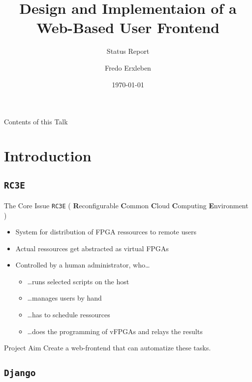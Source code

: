 \documentclass{beamer}
\title{Design and Implementaion of a Web-Based \rccce{} User Frontend}
\subtitle{Status Report}
\author{Fredo Erxleben}
\date{\today}
\institute{Chair for VLSI Design, Diagnostics and Architecture}
\newcommand{\rccce}{\texttt{RC3E}}
\newcommand{\django}{\texttt{Django}}
\begin{document}
\maketitle

    \begin{frame}{Contents of this Talk}
        \tableofcontents
    \end{frame}


\section{Introduction}
\subsection{\rccce{}}

    \begin{frame}{The Core Issue}
        \rccce{} (
            \textbf{R}econfigurable 
            \textbf{C}ommon 
            \textbf{C}loud 
            \textbf{C}omputing 
            \textbf{E}nvironment
        ) \\
        \begin{itemize}
            \item System for distribution of FPGA ressources to remote users
            \item Actual ressources get abstracted as virtual FPGAs
            \item Controlled by a human administrator, who\dots
            \begin{itemize}
                \item \dots runs selected scripts on the host
                \item \dots manages users by hand
                \item \dots has to schedule ressources
                \item \dots does the programming of vFPGAs and relays the results
            \end{itemize}
        \end{itemize}

        \begin{block}{Project Aim}
            Create a web-frontend that can automatize these tasks.
        \end{block}
    \end{frame}

\subsection{\django{}}
\end{document}
